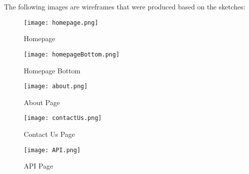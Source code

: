 The following images are wireframes that were produced based on the sketches:
\begin{figure}
    \caption{Homepage}
    \centering
    \texttt{[image: homepage.png]}
\end{figure}
\begin{figure}
    \caption{Homepage Bottom}
    \centering
    \texttt{[image: homepageBottom.png]}
\end{figure}
\begin{figure}
    \caption{About Page}
    \centering
    \texttt{[image: about.png]}
\end{figure}
\begin{figure}
    \caption{Contact Us Page}
    \centering
    \texttt{[image: contactUs.png]}
\end{figure}
\begin{figure}
    \caption{API Page}
    \centering
    \texttt{[image: API.png]}
\end{figure}